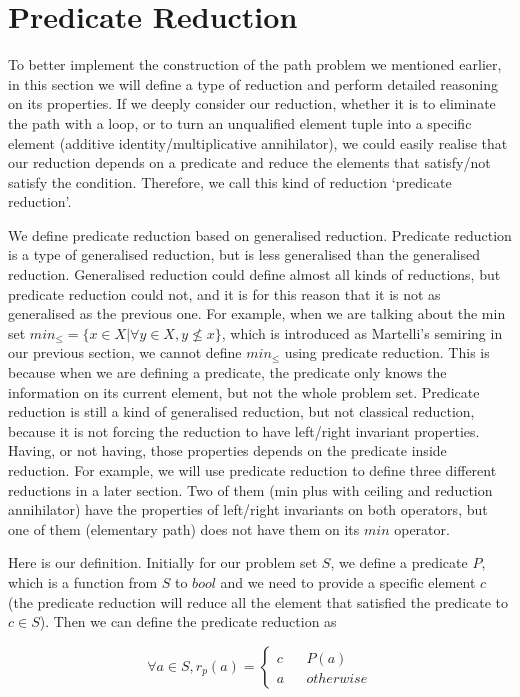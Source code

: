 \documentclass[a4paper,12pt,twoside,openright]{report}
\newcommand{\e}[2]{
\begin{equation}
  \label{#1} 
  #2
\end{equation}
}
\begin{document}
\section{Predicate Reduction}
To better implement the construction of the path problem we mentioned earlier, in this section we will define a type of reduction and perform detailed reasoning on its properties. 
If we deeply consider our reduction, whether it is to eliminate the path with a loop, or to turn an unqualified element tuple into a specific element (additive identity/multiplicative annihilator), we could easily realise that our reduction depends on a predicate and reduce the elements that satisfy/not satisfy the condition. Therefore, we call this kind of reduction ‘predicate reduction’. 

We define predicate reduction based on generalised reduction. 
Predicate reduction is a type of generalised reduction, but is less generalised than the generalised reduction.  Generalised reduction could define almost all kinds of reductions, but predicate reduction could not, and it is for this reason that it is not as generalised as the previous one. For example, when we are talking about the min set $min_\leq = \{ x \in X | \forall y \in X, y \not\leq x \}$, which is introduced as Martelli’s semiring in our previous section, we cannot define $min_\leq$ using predicate reduction. This is because when we are defining a predicate, the predicate only knows the information on its current element, but not the whole problem set. Predicate reduction is still a kind of generalised reduction, but not classical reduction, because it is not forcing the reduction to have left/right invariant properties. Having, or not having, those properties depends on the predicate inside reduction. For example, we will use predicate reduction to define three different reductions in a later section. Two of them (min plus with ceiling and reduction annihilator) have the properties of left/right invariants on both operators, but one of them (elementary path) does not have them on its $min$ operator. 

Here is our definition. Initially for our problem set $S$, we define a predicate $P$, which is a function from $S$ to $bool$ and we need to provide a specific element $c$ (the predicate reduction will reduce all the element that satisfied the predicate to $c \in S$). Then we can define the predicate reduction as 
\e{pr:def:def}{\forall a \in S, r_p(a)=\left\{
\begin{aligned}
c &  & P(a) \\
a &  & otherwise 
\end{aligned}
\right.}
\end{document}
